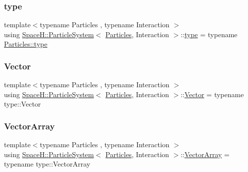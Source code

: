 \mbox{\label{class_space_h_1_1_particle_system_a21376735739dfbe668a70cdba008baa3}} 
\subsubsection{\texorpdfstring{type}{type}}
{\footnotesize\ttfamily template$<$typename Particles , typename Interaction $>$ \\
using \mbox{\hyperlink{class_space_h_1_1_particle_system}{Space\+H\+::\+Particle\+System}}$<$ \mbox{\hyperlink{struct_space_h_1_1_particles}{Particles}}, Interaction $>$\+::\mbox{\hyperlink{class_space_h_1_1_particle_system_a21376735739dfbe668a70cdba008baa3}{type}} =  typename \mbox{\hyperlink{class_space_h_1_1_vel_indep_particles_a09aa167b5fb1b203ab021220601ed74c}{Particles\+::type}}}

\mbox{\label{class_space_h_1_1_particle_system_a7cb2705f7e4edf94131c31eda3edfded}} 
\subsubsection{\texorpdfstring{Vector}{Vector}}
{\footnotesize\ttfamily template$<$typename Particles , typename Interaction $>$ \\
using \mbox{\hyperlink{class_space_h_1_1_particle_system}{Space\+H\+::\+Particle\+System}}$<$ \mbox{\hyperlink{struct_space_h_1_1_particles}{Particles}}, Interaction $>$\+::\mbox{\hyperlink{class_space_h_1_1_particle_system_a7cb2705f7e4edf94131c31eda3edfded}{Vector}} =  typename type\+::\+Vector}

\mbox{\label{class_space_h_1_1_particle_system_acf48c66c8d42b85cd3a77911bb7da9ce}} 
\subsubsection{\texorpdfstring{Vector\+Array}{VectorArray}}
{\footnotesize\ttfamily template$<$typename Particles , typename Interaction $>$ \\
using \mbox{\hyperlink{class_space_h_1_1_particle_system}{Space\+H\+::\+Particle\+System}}$<$ \mbox{\hyperlink{struct_space_h_1_1_particles}{Particles}}, Interaction $>$\+::\mbox{\hyperlink{class_space_h_1_1_particle_system_acf48c66c8d42b85cd3a77911bb7da9ce}{Vector\+Array}} =  typename type\+::\+Vector\+Array}



